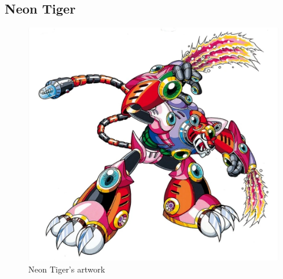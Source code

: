 \subsection{Neon Tiger}\label{boss:Neon_tiger}
\begin{figure}[htp]
	\centering
	\includegraphics[height=\portraitsize]{figures/X3/Neon_tiger/neontiger.png}
		\caption{Neon Tiger's artwork~\cite{book:MMX_Complete_art}}
\end{figure}

